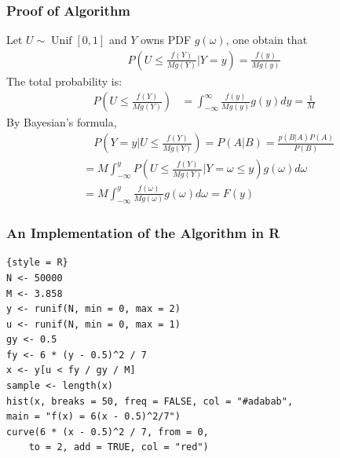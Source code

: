 \begin{frame}
    \frametitle{Proof of Algorithm}
    Let \(U \sim \operatorname{Unif}[0,1]\) and \(Y\) owns PDF \(g(\omega)\), one obtain that
    \vspace*{-.5\baselineskip}
    \begin{align*}
        P\left(U \leq \frac{f(Y)}{Mg(Y)}\bigg |Y = y  \right) = \frac{f(y)}{Mg(y)}
    \end{align*}
    \vspace*{-.5\baselineskip}
    The total probability is:
    \begin{align*}
        P\left(U \leq \frac{f(Y)}{Mg(Y)} \right) &= \int _{-\infty}^\infty\frac{f(y)}{Mg(y)}g(y) dy = \frac 1 M
    \end{align*}
    \vspace*{-.5\baselineskip}
    By Bayesian's formula,
    \begin{align*}
        &\quad P\left(Y = y \bigg | U \leq \frac{f(Y)}{Mg(Y)}  \right)= P(A|B) = \frac{p(B|A)P(A)}{P(B)}\\
        &= M\int_{-\infty}^ y  P\left(U \leq \frac{f(Y)}{Mg(Y)}\bigg |Y = \omega \leq y  \right)g(\omega) d \omega\\
        &= M\int_{-\infty}^ y   \frac{f(\omega)}{Mg(\omega)} g(\omega) d\omega = F(y)
    \end{align*}

    

\end{frame}


\begin{frame}[fragile]
    \frametitle{{An Implementation of the Algorithm in R}}
    \begin{minipage}{\linewidth}
        \begin{lstlisting}{style = R}
N <- 50000
M <- 3.858
y <- runif(N, min = 0, max = 2)
u <- runif(N, min = 0, max = 1)
gy <- 0.5
fy <- 6 * (y - 0.5)^2 / 7
x <- y[u < fy / gy / M]
sample <- length(x)
hist(x, breaks = 50, freq = FALSE, col = "#adabab",
main = "f(x) = 6(x - 0.5)^2/7")
curve(6 * (x - 0.5)^2 / 7, from = 0, 
    to = 2, add = TRUE, col = "red")
    \end{lstlisting}
    \end{minipage}

\end{frame}

